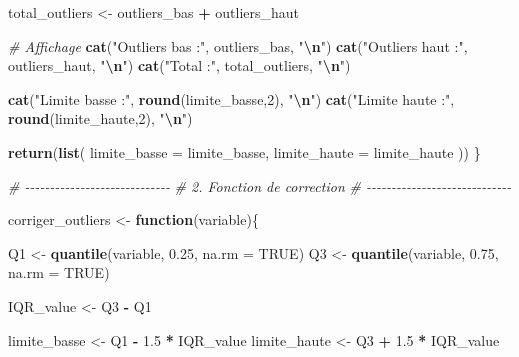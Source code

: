 \documentclass[
]{article}
\newenvironment{Shaded}{\begin{snugshade}}{\end{snugshade}}
\newcommand{\AttributeTok}[1]{\textcolor[rgb]{0.13,0.29,0.53}{#1}}
\newcommand{\CommentTok}[1]{\textcolor[rgb]{0.56,0.35,0.01}{\textit{#1}}}
\newcommand{\ConstantTok}[1]{\textcolor[rgb]{0.56,0.35,0.01}{#1}}
\newcommand{\ControlFlowTok}[1]{\textcolor[rgb]{0.13,0.29,0.53}{\textbf{#1}}}
\newcommand{\DecValTok}[1]{\textcolor[rgb]{0.00,0.00,0.81}{#1}}
\newcommand{\FloatTok}[1]{\textcolor[rgb]{0.00,0.00,0.81}{#1}}
\newcommand{\FunctionTok}[1]{\textcolor[rgb]{0.13,0.29,0.53}{\textbf{#1}}}
\newcommand{\NormalTok}[1]{#1}
\newcommand{\OtherTok}[1]{\textcolor[rgb]{0.56,0.35,0.01}{#1}}
\newcommand{\SpecialCharTok}[1]{\textcolor[rgb]{0.81,0.36,0.00}{\textbf{#1}}}
\newcommand{\StringTok}[1]{\textcolor[rgb]{0.31,0.60,0.02}{#1}}
\begin{document}
\begin{Shaded}
\begin{Highlighting}[]
\NormalTok{total\_outliers }\OtherTok{\textless{}{-}}\NormalTok{ outliers\_bas }\SpecialCharTok{+}\NormalTok{ outliers\_haut}

\CommentTok{\# Affichage}
\FunctionTok{cat}\NormalTok{(}\StringTok{"Outliers bas :"}\NormalTok{, outliers\_bas, }\StringTok{"}\SpecialCharTok{\textbackslash{}n}\StringTok{"}\NormalTok{)}
\FunctionTok{cat}\NormalTok{(}\StringTok{"Outliers haut :"}\NormalTok{, outliers\_haut, }\StringTok{"}\SpecialCharTok{\textbackslash{}n}\StringTok{"}\NormalTok{)}
\FunctionTok{cat}\NormalTok{(}\StringTok{"Total :"}\NormalTok{, total\_outliers, }\StringTok{"}\SpecialCharTok{\textbackslash{}n}\StringTok{"}\NormalTok{)}

\FunctionTok{cat}\NormalTok{(}\StringTok{"Limite basse :"}\NormalTok{, }\FunctionTok{round}\NormalTok{(limite\_basse,}\DecValTok{2}\NormalTok{), }\StringTok{"}\SpecialCharTok{\textbackslash{}n}\StringTok{"}\NormalTok{)}
\FunctionTok{cat}\NormalTok{(}\StringTok{"Limite haute :"}\NormalTok{, }\FunctionTok{round}\NormalTok{(limite\_haute,}\DecValTok{2}\NormalTok{), }\StringTok{"}\SpecialCharTok{\textbackslash{}n}\StringTok{"}\NormalTok{)}

\FunctionTok{return}\NormalTok{(}\FunctionTok{list}\NormalTok{(}
\AttributeTok{limite\_basse =}\NormalTok{ limite\_basse,}
\AttributeTok{limite\_haute =}\NormalTok{ limite\_haute}
\NormalTok{))}
\NormalTok{\}}

\CommentTok{\# {-}{-}{-}{-}{-}{-}{-}{-}{-}{-}{-}{-}{-}{-}{-}{-}{-}{-}{-}{-}{-}{-}{-}{-}{-}{-}{-}{-}{-}}
\CommentTok{\# 2. Fonction de correction}
\CommentTok{\# {-}{-}{-}{-}{-}{-}{-}{-}{-}{-}{-}{-}{-}{-}{-}{-}{-}{-}{-}{-}{-}{-}{-}{-}{-}{-}{-}{-}{-}}

\NormalTok{corriger\_outliers }\OtherTok{\textless{}{-}} \ControlFlowTok{function}\NormalTok{(variable)\{}

\NormalTok{Q1 }\OtherTok{\textless{}{-}} \FunctionTok{quantile}\NormalTok{(variable, }\FloatTok{0.25}\NormalTok{, }\AttributeTok{na.rm =} \ConstantTok{TRUE}\NormalTok{)}
\NormalTok{Q3 }\OtherTok{\textless{}{-}} \FunctionTok{quantile}\NormalTok{(variable, }\FloatTok{0.75}\NormalTok{, }\AttributeTok{na.rm =} \ConstantTok{TRUE}\NormalTok{)}

\NormalTok{IQR\_value }\OtherTok{\textless{}{-}}\NormalTok{ Q3 }\SpecialCharTok{{-}}\NormalTok{ Q1}

\NormalTok{limite\_basse }\OtherTok{\textless{}{-}}\NormalTok{ Q1 }\SpecialCharTok{{-}} \FloatTok{1.5} \SpecialCharTok{*}\NormalTok{ IQR\_value}
\NormalTok{limite\_haute }\OtherTok{\textless{}{-}}\NormalTok{ Q3 }\SpecialCharTok{+} \FloatTok{1.5} \SpecialCharTok{*}\NormalTok{ IQR\_value}


\end{Highlighting}
\end{Shaded}
\end{document}
